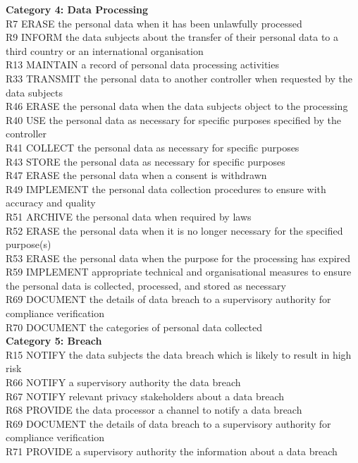 \noindent \textbf{Category 4: Data Processing}\\
R7 ERASE the personal data when it has been unlawfully processed \\
R9 INFORM the data subjects about the transfer of their personal data to a third country or an international organisation \\
R13 MAINTAIN a record of personal data processing activities \\
R33 TRANSMIT the personal data to another controller when requested by the data subjects \\
R46 ERASE the personal data when the data subjects object to the processing \\	
R40 USE the personal data as necessary for specific purposes specified by the controller \\
R41	COLLECT the personal data as necessary for specific purposes \\
R43	STORE the personal data as necessary for specific purposes \\
R47 ERASE the personal data when a consent is withdrawn \\
R49 IMPLEMENT the personal data collection procedures to ensure with accuracy and quality \\
R51 ARCHIVE the personal data when required by laws \\
R52 ERASE the personal data when it is no longer necessary for the specified purpose(s) \\
R53 ERASE the personal data when the purpose for the processing has expired \\
R59 IMPLEMENT appropriate technical and organisational measures to ensure the personal data is collected, processed, and stored as necessary \\
R69 DOCUMENT the details of data breach to a supervisory authority for compliance verification \\
R70 DOCUMENT the categories of personal data collected \\

\noindent \textbf{Category 5: Breach}\\
R15 NOTIFY the data subjects the data breach which is likely to result in high risk \\
R66	NOTIFY a supervisory authority the data breach \\
R67 NOTIFY relevant privacy stakeholders about a data breach \\
R68 PROVIDE the data processor a channel to notify a data breach \\
R69 DOCUMENT the details of data breach to a supervisory authority for compliance verification \\
R71 PROVIDE a supervisory authority the information about a data breach \\

